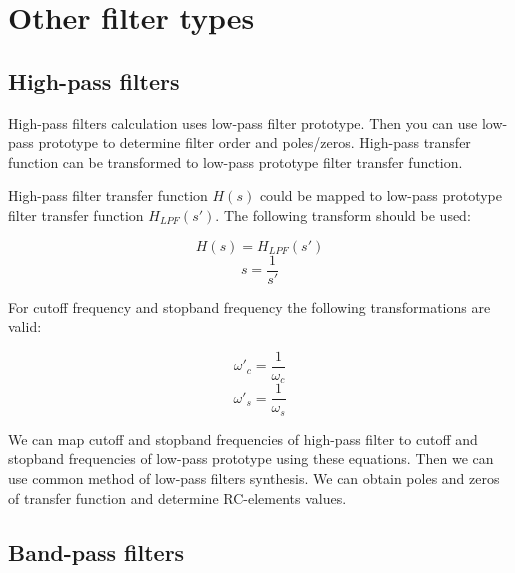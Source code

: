 

\chapter{Other filter types}
\label{sec:other-filt}
\section{High-pass filters}

High-pass filters calculation uses low-pass filter prototype. Then you can use
low-pass prototype to determine filter order and poles/zeros.
High-pass transfer function can be transformed to low-pass prototype filter
transfer function.

High-pass filter transfer function $H(s)$ could be mapped to low-pass prototype
filter transfer function $H_{LPF}(s')$. The following transform should be used:

\begin{equation}
 H(s)=H_{LPF}(s')
\end{equation}
\begin{equation}
 s=\frac{1}{s'}
\end{equation}

For cutoff frequency and stopband frequency the following transformations are
valid:

\begin{equation}
 \omega'_c=\frac{1}{\omega_c}
\end{equation}
\begin{equation}
  \omega'_s=\frac{1}{\omega_s}
\end{equation}

We can map cutoff and stopband frequencies of high-pass filter to cutoff
and stopband frequencies of low-pass prototype using these equations. Then we
can use common method of low-pass filters synthesis. We can obtain poles and
zeros of transfer function and determine RC-elements values.



\section{Band-pass filters}

